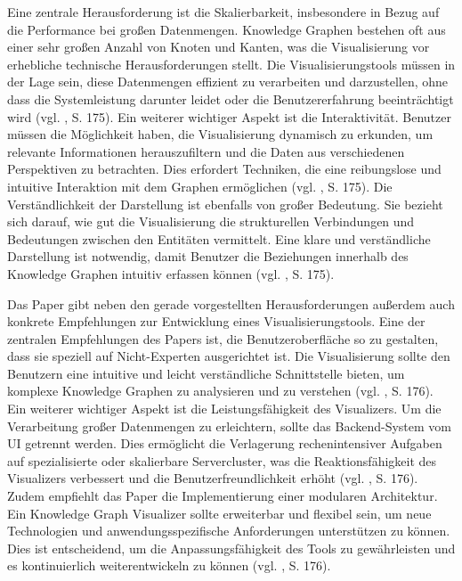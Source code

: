 Eine zentrale Herausforderung ist die Skalierbarkeit, insbesondere in Bezug auf die Performance bei großen Datenmengen. Knowledge Graphen bestehen oft aus einer sehr großen Anzahl von Knoten und Kanten, was die Visualisierung vor erhebliche technische Herausforderungen stellt. Die Visualisierungstools müssen in der Lage sein, diese Datenmengen effizient zu verarbeiten und darzustellen, ohne dass die Systemleistung darunter leidet oder die Benutzererfahrung beeinträchtigt wird (vgl. \cite{kgVisualization:Nararatwong}, S. 175). Ein weiterer wichtiger Aspekt ist die Interaktivität. Benutzer müssen die Möglichkeit haben, die Visualisierung dynamisch zu erkunden, um relevante Informationen herauszufiltern und die Daten aus verschiedenen Perspektiven zu betrachten. Dies erfordert Techniken, die eine reibungslose und intuitive Interaktion mit dem Graphen ermöglichen (vgl. \cite{kgVisualization:Nararatwong}, S. 175). Die Verständlichkeit der Darstellung ist ebenfalls von großer Bedeutung. Sie bezieht sich darauf, wie gut die Visualisierung die strukturellen Verbindungen und Bedeutungen zwischen den Entitäten vermittelt. Eine klare und verständliche Darstellung ist notwendig, damit Benutzer die Beziehungen innerhalb des Knowledge Graphen intuitiv erfassen können (vgl. \cite{kgVisualization:Nararatwong}, S. 175).

Das Paper gibt neben den gerade vorgestellten Herausforderungen außerdem auch konkrete Empfehlungen zur Entwicklung eines Visualisierungstools. Eine der zentralen Empfehlungen des Papers ist, die Benutzeroberfläche so zu gestalten, dass sie speziell auf Nicht-Experten ausgerichtet ist. Die Visualisierung sollte den Benutzern eine intuitive und leicht verständliche Schnittstelle bieten, um komplexe Knowledge Graphen zu analysieren und zu verstehen (vgl. \cite{kgVisualization:Nararatwong}, S. 176). Ein weiterer wichtiger Aspekt ist die Leistungsfähigkeit des Visualizers. Um die Verarbeitung großer Datenmengen zu erleichtern, sollte das Backend-System vom UI getrennt werden. Dies ermöglicht die Verlagerung rechenintensiver Aufgaben auf spezialisierte oder skalierbare Servercluster, was die Reaktionsfähigkeit des Visualizers verbessert und die Benutzerfreundlichkeit erhöht (vgl. \cite{kgVisualization:Nararatwong}, S. 176). Zudem empfiehlt das Paper die Implementierung einer modularen Architektur. Ein Knowledge Graph Visualizer sollte erweiterbar und flexibel sein, um neue Technologien und anwendungsspezifische Anforderungen unterstützen zu können. Dies ist entscheidend, um die Anpassungsfähigkeit des Tools zu gewährleisten und es kontinuierlich weiterentwickeln zu können (vgl. \cite{kgVisualization:Nararatwong}, S. 176).


